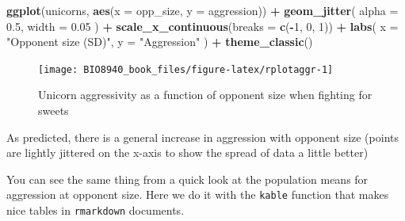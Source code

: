 \documentclass[
  12pt,
]{book}
\newenvironment{Shaded}{\begin{snugshade}}{\end{snugshade}}
\newcommand{\DataTypeTok}[1]{\textcolor[rgb]{0.13,0.29,0.53}{#1}}
\newcommand{\DecValTok}[1]{\textcolor[rgb]{0.00,0.00,0.81}{#1}}
\newcommand{\FloatTok}[1]{\textcolor[rgb]{0.00,0.00,0.81}{#1}}
\newcommand{\KeywordTok}[1]{\textcolor[rgb]{0.13,0.29,0.53}{\textbf{#1}}}
\newcommand{\NormalTok}[1]{#1}
\newcommand{\OperatorTok}[1]{\textcolor[rgb]{0.81,0.36,0.00}{\textbf{#1}}}
\newcommand{\StringTok}[1]{\textcolor[rgb]{0.31,0.60,0.02}{#1}}
\begin{document}
\begin{Shaded}
\begin{Highlighting}[]
\KeywordTok{ggplot}\NormalTok{(unicorns, }\KeywordTok{aes}\NormalTok{(}\DataTypeTok{x =}\NormalTok{ opp_size, }\DataTypeTok{y =}\NormalTok{ aggression)) }\OperatorTok{+}
\StringTok{  }\KeywordTok{geom_jitter}\NormalTok{(}
    \DataTypeTok{alpha =} \FloatTok{0.5}\NormalTok{,}
    \DataTypeTok{width =} \FloatTok{0.05}
\NormalTok{  ) }\OperatorTok{+}
\StringTok{  }\KeywordTok{scale_x_continuous}\NormalTok{(}\DataTypeTok{breaks =} \KeywordTok{c}\NormalTok{(}\OperatorTok{-}\DecValTok{1}\NormalTok{, }\DecValTok{0}\NormalTok{, }\DecValTok{1}\NormalTok{)) }\OperatorTok{+}
\StringTok{  }\KeywordTok{labs}\NormalTok{(}
    \DataTypeTok{x =} \StringTok{"Opponent size (SD)"}\NormalTok{,}
    \DataTypeTok{y =} \StringTok{"Aggression"}
\NormalTok{  ) }\OperatorTok{+}
\StringTok{  }\KeywordTok{theme_classic}\NormalTok{()}
\end{Highlighting}
\end{Shaded}

\begin{figure}

{\centering \texttt{[image: BIO8940\_book\_files/figure-latex/rplotaggr-1]} 

}

\caption{Unicorn aggressivity as a function of opponent size when fighting for sweets}\label{fig:rplotaggr}
\end{figure}

As predicted, there is a general increase in aggression with opponent size (points are lightly jittered on the x-axis to show the spread of data a little better)

You can see the same thing from a quick look at the population means for aggression at opponent size. Here we do it with the \texttt{kable} function that makes nice tables in \texttt{rmarkdown} documents.

\begin{Shaded}
\end{Shaded}
\end{document}
